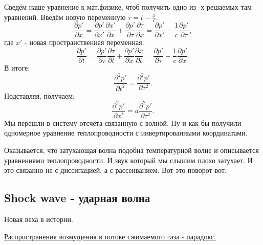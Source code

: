 \documentclass[14pt,a4paper,oneside]{extarticle}	%
\newcommand{\RomanNumeralCaps}[1]{\MakeUppercase{\romannumeral #1}}
\begin{document}
Сведём наше уравнение к мат.физике, чтоб получить одно из \RomanNumeralCaps{3}-х решаемых там уравнений.
Введём новую переменную $ \tau = t - \frac{x}{c} $.
\begin{equation*}
\frac{\partial p'}{\partial x} = \frac{\partial p'}{\partial x'}\frac{\partial x'}{\partial x} + \frac{\partial p'}{\partial \tau}\frac{\partial \tau}{\partial x} = \frac{\partial p'}{\partial x'} -\frac{1}{c} \frac{\partial p'}{\partial \tau},
\end{equation*}
где $ x' $ - новая пространственная переменная.
\begin{equation*}
\frac{\partial p'}{\partial t} = \frac{\partial p'}{\partial \tau}\frac{\partial \tau}{\partial t} + \frac{\partial p'}{\partial x}\frac{\partial x}{\partial t} = \frac{\partial p'}{\partial \tau} -\frac{1}{c} \frac{\partial p'}{\partial x}.
\end{equation*}
В итоге:
\begin{equation*}
\frac{\partial^{2} p'}{\partial t^{2}} = \frac{\partial^{2} p'}{\partial \tau^{2}}.
\end{equation*}
Подставляя, получаем: 
\begin{equation*}
\frac{\partial^{2} p'}{\partial x'} = a\frac{\partial^{2} p'}{\partial \tau^{2}}.
\end{equation*}
Мы перешли в систему отсчёта связанную с волной. Ну и как бы получили одномерное уравнение теплопроводности с инвертированными координатами.

Оказывается, что затухающая волна подобна температурной волне и описывается уравнениями теплопроводности.
И звук который мы слышим плохо затухает. И это связанно не с диссипацией, а с рассеиванием.
Вот это поворот вот.

\newpage
\begin{center}
	\subsection*{Shock wave - ударная волна} %
	Новая веха в истории.
\end{center}

\underline{Распространения возмущения в потоке сжимаемого газа - парадокс. }
\end{document}
